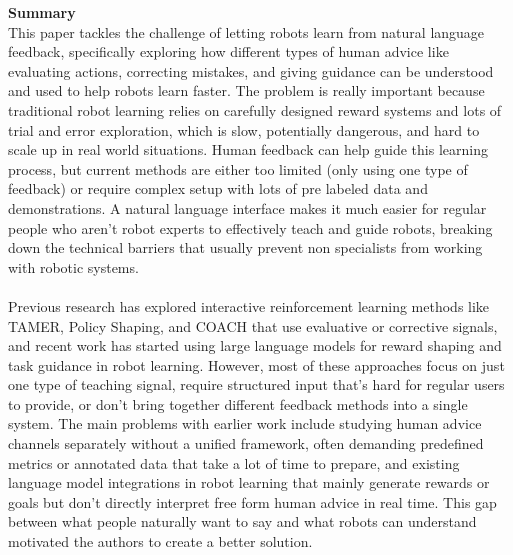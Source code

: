 \documentclass[report.tex]{subfiles}
\begin{document}
\noindent\textbf{Summary} \\
This paper tackles the challenge of letting robots learn from natural language feedback, specifically exploring how different types of human advice like evaluating actions, correcting mistakes, and giving guidance can be understood and used to help robots learn faster. The problem is really important because traditional robot learning relies on carefully designed reward systems and lots of trial and error exploration, which is slow, potentially dangerous, and hard to scale up in real world situations. Human feedback can help guide this learning process, but current methods are either too limited (only using one type of feedback) or require complex setup with lots of pre labeled data and demonstrations. A natural language interface makes it much easier for regular people who aren't robot experts to effectively teach and guide robots, breaking down the technical barriers that usually prevent non specialists from working with robotic systems.\\\\
Previous research has explored interactive reinforcement learning methods like TAMER, Policy Shaping, and COACH that use evaluative or corrective signals, and recent work has started using large language models for reward shaping and task guidance in robot learning. However, most of these approaches focus on just one type of teaching signal, require structured input that's hard for regular users to provide, or don't bring together different feedback methods into a single system. The main problems with earlier work include studying human advice channels separately without a unified framework, often demanding predefined metrics or annotated data that take a lot of time to prepare, and existing language model integrations in robot learning that mainly generate rewards or goals but don't directly interpret free form human advice in real time. This gap between what people naturally want to say and what robots can understand motivated the authors to create a better solution.
\end{document}
